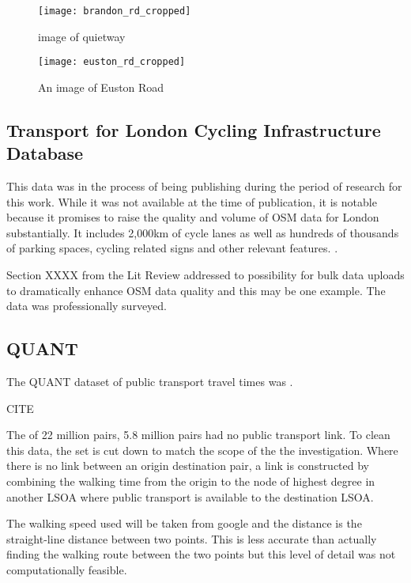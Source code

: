 \begin{figure}
\centering
\texttt{[image: brandon\_rd\_cropped]}
\caption{image of quietway}
\end{figure}

\begin{figure}
\centering
\texttt{[image: euston\_rd\_cropped]}
\caption{An image of Euston Road}
\label{fig:euston}
\end{figure}

\subsection{Transport for London Cycling Infrastructure Database}

\cite{tflcid}

This data was in the process of being publishing during the period of research for this work. While it was not available at the time of publication, it is notable because it promises to raise the quality and volume of OSM data for London substantially. It includes 2,000km of cycle lanes as well as hundreds of thousands of parking spaces, cycling related signs and other relevant features. \cite{osmtflcidwiki}. 

Section XXXX from the Lit Review addressed to possibility for bulk data uploads to dramatically enhance OSM data quality and this may be one example. The data was professionally surveyed. 

\subsection{QUANT}

The QUANT dataset of public transport travel times was .

CITE

The of 22 million pairs, 5.8 million pairs had no public transport link. To clean this data, the set is cut down to match the scope of the the investigation. Where there is no link between an origin destination pair, a link is constructed by combining the walking time from the origin to the node of highest degree in another LSOA where public transport is available to the destination LSOA. 

The walking speed used will be taken from google and the distance is the straight-line distance between two points. This is less accurate than actually finding the walking route between the two points but this level of detail was not computationally feasible. 

